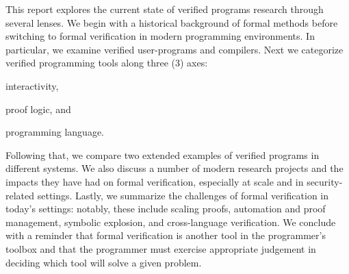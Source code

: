 This report explores the current state of verified programs research through
several lenses. We begin with a historical background of formal methods before
switching to formal verification in modern programming environments. In
particular, we examine verified user-programs and compilers. Next we categorize
verified programming tools along three (3) axes:
\begin{inlist}
\item interactivity,
\item proof logic, and
\item programming language.
\end{inlist}
Following that, we compare two extended examples of verified programs in
different systems. We also discuss a number of modern research projects and the
impacts they have had on formal verification, especially at scale and in
security-related settings. Lastly, we summarize the challenges of formal
verification in today's settings: notably, these include scaling proofs,
automation and proof management, symbolic explosion, and cross-language
verification. We conclude with a reminder that formal verification is another
tool in the programmer's toolbox and that the programmer must exercise
appropriate judgement in deciding which tool will solve a given problem.
